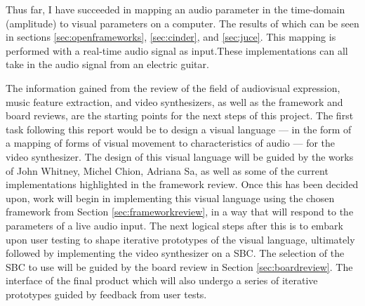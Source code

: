 \documentclass[../initial_thesis.tex]{subfiles}
\begin{document}

Thus far, I have succeeded in mapping an audio parameter in the time-domain (amplitude) to visual parameters on a computer. The results of which can be seen in sections \ref{sec:openframeworks}, \ref{sec:cinder}, and \ref{sec:juce}. This mapping is performed with a real-time audio signal as input.\footnotemark These implementations can all take in the audio signal from an electric guitar. \par
{}


The information gained from the review of the field of audiovisual expression, music feature extraction, and video synthesizers, as well as the framework and board reviews, are the starting points for the next steps of this project. The first task following this report would be to design a visual language --- in the form of a mapping of forms of visual movement to characteristics of audio --- for the video synthesizer. The design of this visual language will be guided by the works of John Whitney, Michel Chion, Adriana Sa, as well as some of the current implementations highlighted in the framework review. Once this has been decided upon, work will begin in implementing this visual language using the chosen framework from Section \ref{sec:frameworkreview}, in a way that will respond to the parameters of a live audio input. The next logical steps after this is to embark upon user testing to shape iterative prototypes of the visual language, ultimately followed by implementing the video synthesizer on a SBC. The selection of the SBC to use will be guided by the board review in Section \ref{sec:boardreview}. The interface of the final product which will also undergo a series of iterative prototypes guided by feedback from user tests.
\end{document}
